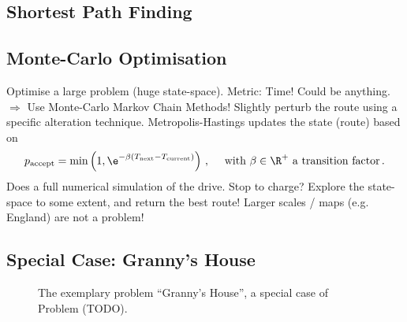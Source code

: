\documentclass[12pt, a4paper]{article}
\begin{document}
  \subsection{Shortest Path Finding}
  \subsection{Monte-Carlo Optimisation}
  Optimise a large problem (huge state-space). Metric: Time! Could be anything.
  $\Rightarrow$ Use Monte-Carlo Markov Chain Methods!
  Slightly perturb the route using a specific alteration technique.
  Metropolis-Hastings updates the state (route) based on $$p_{\rm accept} = \min\left(1, \e^{-\beta (T_{\rm next} - T_{\rm current})}\right)\,, \quad \text{ with } \beta \in \R^+ \text{ a transition factor} \,.$$
  Does a full numerical simulation of the drive. Stop to charge?
  Explore the state-space to some extent, and return the best route!
  Larger scales / maps (e.g. England) are not a problem!

  \subsection{Special Case: Granny's House}
  \begin{figure}[H]
    \centering
    \caption{The exemplary problem ``Granny's House'', a special case of Problem (TODO).}
  \end{figure}
\end{document}
